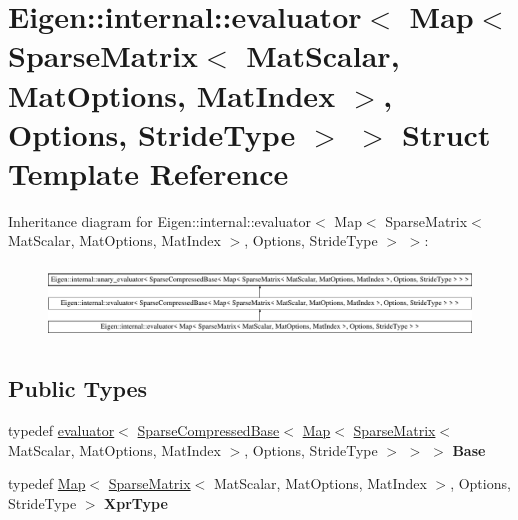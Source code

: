 \hypertarget{struct_eigen_1_1internal_1_1evaluator_3_01_map_3_01_sparse_matrix_3_01_mat_scalar_00_01_mat_optic7190da6f4a73606f624a88388745a36}{}\section{Eigen\+::internal\+::evaluator$<$ Map$<$ Sparse\+Matrix$<$ Mat\+Scalar, Mat\+Options, Mat\+Index $>$, Options, Stride\+Type $>$ $>$ Struct Template Reference}
\label{struct_eigen_1_1internal_1_1evaluator_3_01_map_3_01_sparse_matrix_3_01_mat_scalar_00_01_mat_optic7190da6f4a73606f624a88388745a36}
Inheritance diagram for Eigen\+::internal\+::evaluator$<$ Map$<$ Sparse\+Matrix$<$ Mat\+Scalar, Mat\+Options, Mat\+Index $>$, Options, Stride\+Type $>$ $>$\+:\begin{figure}[H]
\begin{center}
\leavevmode
\includegraphics[height=1.985816cm]{struct_eigen_1_1internal_1_1evaluator_3_01_map_3_01_sparse_matrix_3_01_mat_scalar_00_01_mat_optic7190da6f4a73606f624a88388745a36}
\end{center}
\end{figure}
\subsection*{Public Types}
\begin{DoxyCompactItemize}
\item 
\mbox{\label{struct_eigen_1_1internal_1_1evaluator_3_01_map_3_01_sparse_matrix_3_01_mat_scalar_00_01_mat_optic7190da6f4a73606f624a88388745a36_ae328a90c883917fc00b3eb9855c2e9d3}} 
typedef \mbox{\hyperlink{struct_eigen_1_1internal_1_1evaluator}{evaluator}}$<$ \mbox{\hyperlink{class_eigen_1_1_sparse_compressed_base}{Sparse\+Compressed\+Base}}$<$ \mbox{\hyperlink{class_eigen_1_1_map}{Map}}$<$ \mbox{\hyperlink{class_eigen_1_1_sparse_matrix}{Sparse\+Matrix}}$<$ Mat\+Scalar, Mat\+Options, Mat\+Index $>$, Options, Stride\+Type $>$ $>$ $>$ {\bfseries Base}
\item 
\mbox{\label{struct_eigen_1_1internal_1_1evaluator_3_01_map_3_01_sparse_matrix_3_01_mat_scalar_00_01_mat_optic7190da6f4a73606f624a88388745a36_ae2abfc7cfbf1c41b3efa75bdb65f825d}} 
typedef \mbox{\hyperlink{class_eigen_1_1_map}{Map}}$<$ \mbox{\hyperlink{class_eigen_1_1_sparse_matrix}{Sparse\+Matrix}}$<$ Mat\+Scalar, Mat\+Options, Mat\+Index $>$, Options, Stride\+Type $>$ {\bfseries Xpr\+Type}
\end{DoxyCompactItemize}

